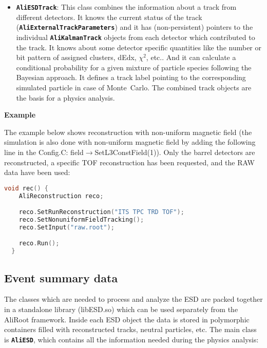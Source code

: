 \documentclass[12pt,a4paper,twoside]{article}
\makeatletter
\newcommand{\class}[1]{\texttt{\textbf{#1}}\xspace}
\newcommand {\MC} {Monte~Carlo\@\xspace}
\newcommand {\aliroot} {AliRoot\@\xspace}
\makeatother
\begin{document}
\begin{itemize}
\item \class{AliESDTrack}: 
  This class combines the information about a track from different detectors.
  It knows the current status of the track
  (\class{AliExternalTrackParameters}) and it has (non-persistent) pointers
  to the individual \class{AliKalmanTrack} objects from each detector
  which contributed to the track. 
  It knows about some detector specific quantities like the number or
  bit pattern of assigned clusters, dEdx, $\chi^2$, etc.. 
  And it can calculate a conditional probability for a given mixture of
  particle species following the Bayesian approach.
  It defines a track label pointing to the corresponding simulated
  particle in case of \MC. 
  The combined track objects are the basis for a physics analysis.

\end{itemize}

\noindent
\textbf{Example}

The example below shows reconstruction with non-uniform magnetic field
(the simulation is also done with non-uniform magnetic field by adding
the following line in the Config.C: field$\to$SetL3ConstField(1)). Only
the barrel detectors are reconstructed, a specific TOF reconstruction
has been requested, and the RAW data have been used:

\begin{lstlisting}[language=C++]
  void rec() {
    AliReconstruction reco;

    reco.SetRunReconstruction("ITS TPC TRD TOF");
    reco.SetNonuniformFieldTracking();
    reco.SetInput("raw.root");

    reco.Run();
  }
\end{lstlisting}


\subsection{Event summary data}\label{ESD}

The classes which are needed to process and analyze the ESD are packed
together in a standalone library (libESD.so) which can be used
separately from the \aliroot framework. Inside each 
ESD object the data is stored in polymorphic containers filled with
reconstructed tracks, neutral particles, etc. The main class is
\class{AliESD}, which contains all the information needed during the
physics analysis:
\end{document}

